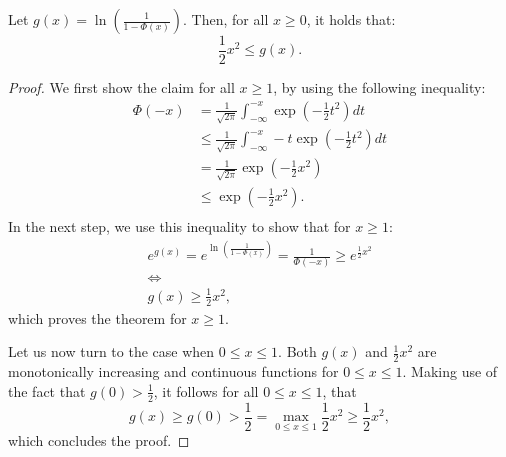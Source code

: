 \begin{lemma}
    \label{lemma:lower-bound}
    Let $g(x) = \ln \left( \frac{1}{1 - \Phi(x)}\right)$.
    Then, for all $x \geq 0$, it holds that:
    \begin{equation*}
        \frac{1}{2} x^2 \leq g(x).
    \end{equation*}
\end{lemma}
\begin{proof}
    We first show the claim for all $x \geq 1$, by using the following
    inequality:
    \begin{align*}
        \Phi(-x) & = \frac{1}{\sqrt{2 \pi}} \int_{-\infty}^{-x} \exp{ \left(-\frac{1}{2} t^2 \right)} dt       \\
                 & \leq \frac{1}{\sqrt{2 \pi}} \int_{-\infty}^{-x} -t \exp{ \left(-\frac{1}{2} t^2 \right)} dt \\
                 & = \frac{1}{\sqrt{2 \pi}} \exp{\left( -\frac{1}{2} x^2 \right)}                              \\
                 & \leq \exp{\left( -\frac{1}{2} x^2 \right)}.                                                 \\
    \end{align*}
    In the next step, we use this inequality to show that for $x \geq 1$:
    \begin{gather*}
        e^{g(x)} = e^{\ln \left( \frac{1}{1 - \Phi(x)} \right)} = \frac{1}{\Phi(-x)} \geq e^{\frac{1}{2} x^2}\\
        \iff \\
        g(x) \geq \frac{1}{2} x^2,
    \end{gather*}
    which proves the theorem for $x \geq 1$.

    Let us now turn to the case when $0 \leq x \leq 1$.
    Both $g(x)$ and $\frac{1}{2}x^2$ are monotonically increasing
    and continuous functions for $0 \leq x \leq 1$.
    Making use of the fact that $g(0) > \frac{1}{2}$, it follows
    for all $0 \leq x \leq 1$, that
    \begin{equation*}
        g(x) \geq g(0) > \frac{1}{2} = \max_{0 \leq x \leq 1} \frac{1}{2} x^2 \geq \frac{1}{2} x^2,
    \end{equation*}
    which concludes the proof.
\end{proof}

